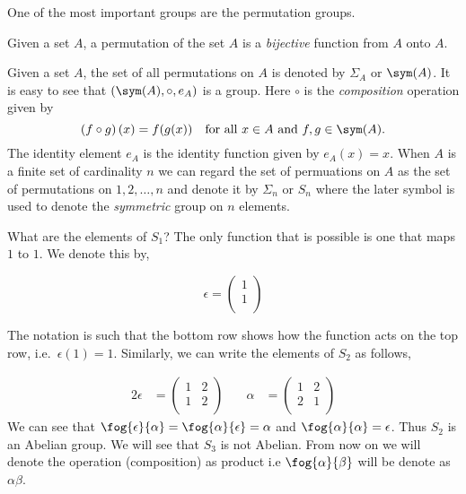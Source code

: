 One of the most important groups are the permutation groups.
\begin{Definition}
    Given a set $A$, a permutation of the set $A$ is a \emph{bijective} function from $A$ onto $A$.
\end{Definition}

Given a set $A$, the set of all permutations on $A$ is denoted by $\Sigma_{A}$ or $\sym(A)$. It is easy to see
that $\left(\sym(A),\circ,e_A\right)$ is a group. Here
$\circ$ is the \emph{composition} operation given by 
\begin{equation*}
    \left(f \circ g\right)(x) = f(g(x)) \quad \text{for all $x \in A$ and $f,g \in \sym(A)$}.
\end{equation*}
The identity element $e_A$ is the identity function given by $e_A(x) = x$.
When $A$ is a finite set of cardinality $n$ we can regard the set of permuations on $A$ as the set
of permutations on $1,2,\ldots,n$ and denote it by $\Sigma_{n}$ or $S_n$ where the later symbol is
used to denote the \emph{symmetric} group on $n$ elements.

What are the elements of $S_1$? The only function that is possible is one that maps $1$ to $1$.
We denote this by,

\begin{equation*}
    \epsilon =
    \begin{pmatrix}
	1\\
	1\\
    \end{pmatrix}
\end{equation*}

The notation is such that the bottom row shows how the function acts on the top row, i.e.~$\epsilon(1) = 1$.
Similarly, we can write the elements of $S_2$ as follows,

\begin{alignat*}{2}
\epsilon &=
 \begin{pmatrix}
  1 & 2  \\
  1 & 2  \\
 \end{pmatrix}
 & \quad \alpha &=  
 \begin{pmatrix}
  1 & 2\\
  2 & 1 \\
 \end{pmatrix}
\end{alignat*}
We can see that $\fog{\epsilon}{\alpha} = \fog{\alpha}{\epsilon} = \alpha$ and $\fog{\alpha}{\alpha} =
\epsilon$. Thus $S_2$ is an Abelian group. We will see that $S_3$ is not Abelian. From now on we will denote
the operation (composition) as product i.e $\fog{\alpha}{\beta}$ will be denote as $\alpha\beta$.

